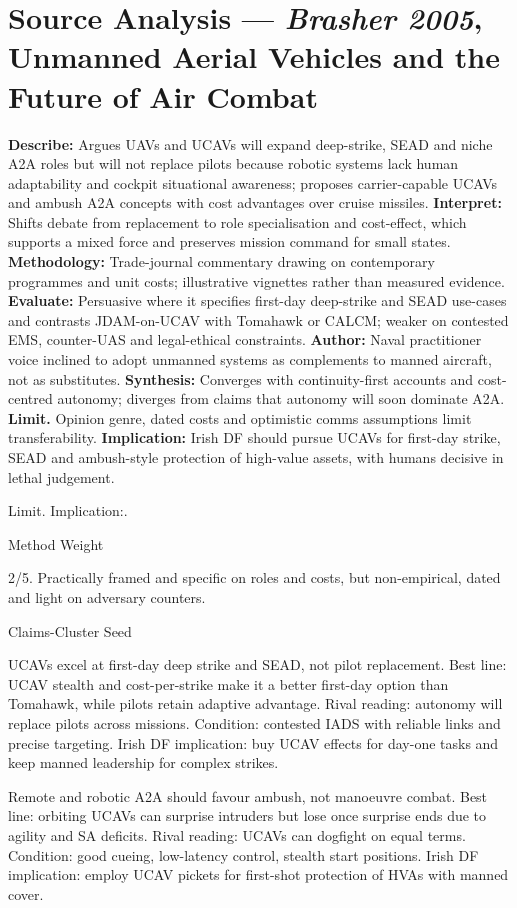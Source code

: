 \section*{Source Analysis — \textit{Brasher 2005}, Unmanned Aerial Vehicles and the Future of Air Combat}
\textbf{Describe:} Argues UAVs and UCAVs will expand deep-strike, SEAD and niche A2A roles but will not replace pilots because robotic systems lack human adaptability and cockpit situational awareness; proposes carrier-capable UCAVs and ambush A2A concepts with cost advantages over cruise missiles.
\textbf{Interpret:} Shifts debate from replacement to role specialisation and cost-effect, which supports a mixed force and preserves mission command for small states.
\textbf{Methodology:} Trade-journal commentary drawing on contemporary programmes and unit costs; illustrative vignettes rather than measured evidence.
\textbf{Evaluate:} Persuasive where it specifies first-day deep-strike and SEAD use-cases and contrasts JDAM-on-UCAV with Tomahawk or CALCM; weaker on contested EMS, counter-UAS and legal-ethical constraints.
\textbf{Author:} Naval practitioner voice inclined to adopt unmanned systems as complements to manned aircraft, not as substitutes.
\textbf{Synthesis:} Converges with continuity-first accounts and cost-centred autonomy; diverges from claims that autonomy will soon dominate A2A.
\textbf{Limit.} Opinion genre, dated costs and optimistic comms assumptions limit transferability.
\textbf{Implication:} Irish DF should pursue UCAVs for first-day strike, SEAD and ambush-style protection of high-value assets, with humans decisive in lethal judgement.

Limit. Implication:.

Method Weight

2/5. Practically framed and specific on roles and costs, but non-empirical, dated and light on adversary counters.

Claims-Cluster Seed

UCAVs excel at first-day deep strike and SEAD, not pilot replacement.
Best line: UCAV stealth and cost-per-strike make it a better first-day option than Tomahawk, while pilots retain adaptive advantage.
Rival reading: autonomy will replace pilots across missions.
Condition: contested IADS with reliable links and precise targeting.
Irish DF implication: buy UCAV effects for day-one tasks and keep manned leadership for complex strikes.

Remote and robotic A2A should favour ambush, not manoeuvre combat.
Best line: orbiting UCAVs can surprise intruders but lose once surprise ends due to agility and SA deficits.
Rival reading: UCAVs can dogfight on equal terms.
Condition: good cueing, low-latency control, stealth start positions.
Irish DF implication: employ UCAV pickets for first-shot protection of HVAs with manned cover.


